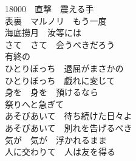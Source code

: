 {18000　直撃　震える手\\
表裏　マルノリ　もう一度\\
海底撈月　汝等には\\
さて　さて　会うべきだろう\\

有終の\\
ひとりぼっち　退屈がまさかの\\
ひとりぼっち　戯れに変じて\\
身を　身を　預けるなら\\
祭りへと急ぎて\\
あそびあいて　待ち続けた日々よ\\
あそびあいて　別れを告げるべき\\
気が　気が　浮かれるまま\\
人に交わりて　人は友を得る
}

